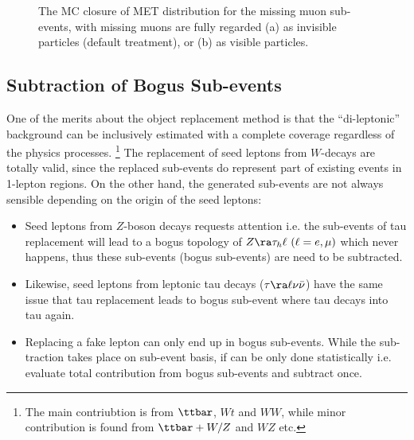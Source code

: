 \begin{description}
\begin{figure}[h]
  \centering
    \caption{The MC closure of MET distribution for the missing muon sub-events, with missing muons are fully regarded (a) as invisible particles (default treatment), or (b) as visible particles.
      \label{fig::BGestimation::objRep::mcClosure::metSoftTerm_mu} }
\end{figure}

\end{description}
\clearpage



\clearpage
\subsection{Subtraction of Bogus Sub-events} \label{sec::BGestimation::objRep::subtraction}
One of the merits about the object replacement method is that 
the ``di-leptonic'' background can be inclusively estimated with a complete coverage regardless of the physics processes.
\footnote{The main contriubtion is from $\ttbar$, $Wt$ and $WW$, while minor contribution is found from $\ttbar+W/Z$ and $WZ$ etc.}
The replacement of seed leptons from $W$-decays are totally valid, since the replaced sub-events do represent part of existing events in 1-lepton regions. 
On the other hand, the generated sub-events are not always sensible depending on the origin of the seed leptons:
\begin{itemize}
\item Seed leptons from $Z$-boson decays requests attention i.e. the sub-events of tau replacement will lead to a bogus topology of $Z\ra \tau_h \ell \,\, (\ell=e,\mu)$ which never happens, thus these sub-events (bogus sub-events) are need to be subtracted.  
%
\item Likewise, seed leptons from leptonic tau decays ($\tau \ra \ell \nu\bar{\nu}$) have the same issue that tau replacement leads to bogus sub-event where tau decays into tau again. 
%
\item Replacing a fake lepton can only end up in bogus sub-events. While the sub-traction takes place on sub-event basis, if can be only done statistically i.e. evaluate total contribution from bogus sub-events and subtract once.
\end{itemize}

